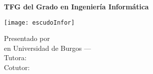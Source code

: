 \renewcommand\maketitle{
    \thispagestyle{empty}

    \cabecera
    \vfill

    \begin{minipage}{0.74\textwidth}
        \begin{tcolorbox}[
                colback=blue!10,
                colframe=blue!20!black!40,
                top=16pt,
                bottom=16pt
            ]
            \begin{center}
                \large\textbf{TFG del Grado en Ingeniería Informática}

                \bigbreak

                \LARGE\textbf{\thetitle}
            \end{center}
        \end{tcolorbox}
    \end{minipage}
    \hfill
    \begin{minipage}{0.2\textwidth}
        \texttt{[image: escudoInfor]}
    \end{minipage}


    \vfill

    \begin{center}
        \noindent\LARGE
        Presentado por \theauthor\\
        en Universidad de Burgos --- \thedate\\
        Tutora: \thetutor\\
        Cotutor: \thecotutor\\
    \end{center}

    \clearpage
}
\maketitle
